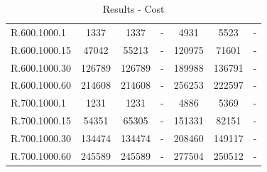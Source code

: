 \documentclass[]{article}
\begin{document}
\begin{table}[H]
\begin{tabular}{lcccccc}
			R.600.1000.1   & 1337   &    1337    & -      &   4931   &   5523   &   -     \\
			R.600.1000.15  & 47042  &    55213   & -      &   120975 &   71601  &   -     \\
			R.600.1000.30  & 126789 &    126789  & -      &   189988 &   136791 &   -     \\
			R.600.1000.60  & 214608 &    214608  & -      &   256253 &   222597 &   -     \\
			R.700.1000.1   & 1231   &    1231    & -      &   4886   &   5369   &   -     \\
			R.700.1000.15  & 54351  &    65305   & -      &   151331 &   82151  &   -     \\
			R.700.1000.30  & 134474 &    134474  & -      &   208460 &   149117 &   -     \\
			R.700.1000.60  & 245589 &    245589  & -      &   277504 &   250512 &   -     \\
		\end{tabular}
		\caption{Results - Cost}
		\label{table:results_cost}
	\end{table}
	
\end{document}
